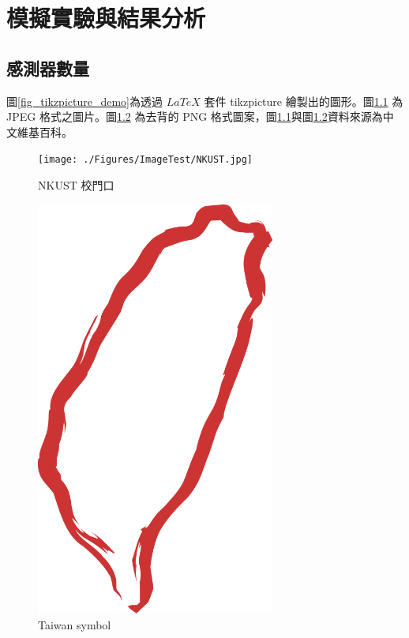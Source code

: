\chapter{模擬實驗與結果分析}\label{Experimental_results}


\section{感測器數量}

圖\ref{fig_tikzpicture_demo}為透過 $LaTeX$ 套件 tikzpicture 繪製出的圖形。圖\ref{fig_nkust} 為 JPEG 格式之圖片。圖\ref{fig_taiwan_symbol} 為去背的 PNG 格式圖案，圖\ref{fig_nkust}\cite{nkust_jpg}與圖\ref{fig_taiwan_symbol}\cite{taiwan_symbol}資料來源為中文維基百科。



\begin{figure}[H] 
    \centering 
    \texttt{[image: ./Figures/ImageTest/NKUST.jpg]} 
    \caption{NKUST 校門口}
    \label{fig_nkust}
\end{figure}

\begin{figure}[H] 
    \centering 
    \includegraphics[width=0.7\textwidth]{./Figures/ImageTest/Taiwan_symbol.png} 
    \caption{Taiwan symbol}
    \label{fig_taiwan_symbol}
\end{figure}

